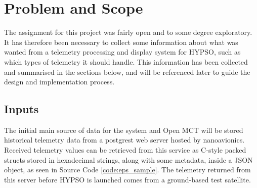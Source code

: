 \begin{comment}
Assignment has no clear scope or specification, exploratory to some degree since much of it is unknown - set own requirements

Design Open MCT implementation; get telemetry from different sources, parse and adapt for display

Minimize overhead with adding new data sources - should require work in a small amount of new code; backend and frontend needs to be flexible

Prioritize loading and working with current known data sources (NA telemetry)
Requirements
 - Should be able to load current NA telemetry from their DB
 - Needs to be modular and maintainable
 - Should be able to provide x amount of data to x users in x time
 
What do we have to work with - how do we get telemetry, what form does it come in?
 - C struct stored in hex string

What restrictions do we have on how/when/where we can get the telemetry?
 - Restricted by IP, cannot get telemetry from anywhere easily - need to go through NA contact person to get new machines added

What does Open MCT need?
 - Object provider
 - Telemetry provider
 - Telemetry metadata provider
\end{comment}

\section{Problem and Scope} \label{scope}
The assignment for this project was fairly open and to some degree exploratory. It has therefore been necessary to collect some information about what was wanted from a telemetry processing and display system for HYPSO, such as which types of telemetry it should handle. This information has been collected and summarised in the sections below, and will be referenced later to guide the design and implementation process.

\subsection{Inputs}
The initial main source of data for the system and Open MCT will be stored historical telemetry data from a \Gls{postgrest} web server hosted by \Gls{nanoavionics}. Received telemetry values can be retrieved from this service as C-style packed \glspl{struct} stored in hexadecimal strings, along with some metadata, inside a JSON object, as seen in Source Code \ref{code:eps_sample}. The telemetry returned from this server before HYPSO is launched comes from a ground-based test satellite. \cite{na_postgrest}

